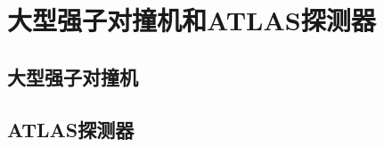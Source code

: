 \chapter{大型强子对撞机和ATLAS探测器}
\label{chap:LHCandATLAS}

\section{大型强子对撞机}


\section{ATLAS探测器~\cite{ATLAS:2008xda}}

